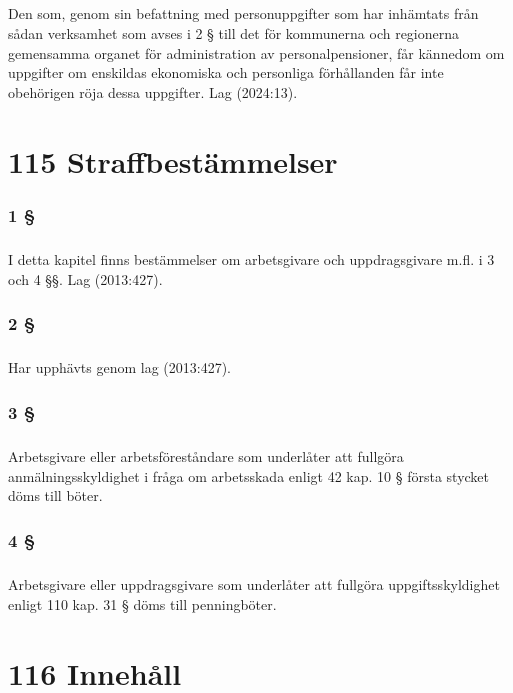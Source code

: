 \documentclass[a4paper,notitlepage,openany,10pt]{book}
\begin{document}
\paragraph*{}
Den som, genom sin befattning med personuppgifter som har inhämtats från sådan verksamhet som avses i 2 § till det för kommunerna och regionerna gemensamma organet för administration av personalpensioner, får kännedom om uppgifter om enskildas ekonomiska och personliga förhållanden får inte obehörigen röja dessa uppgifter.
Lag (2024:13).
\chapter*{115 Straffbestämmelser}
\subsection*{1 §}
\paragraph*{}
I detta kapitel finns bestämmelser om arbetsgivare och uppdragsgivare m.fl. i 3 och 4 §§.
Lag (2013:427).
\subsection*{2 §}
\paragraph*{}
Har upphävts genom
lag (2013:427).
\subsection*{3 §}
\paragraph*{}
Arbetsgivare eller arbetsföreståndare som underlåter att fullgöra anmälningsskyldighet i fråga om arbetsskada enligt 42 kap. 10 § första stycket döms till böter.
\subsection*{4 §}
\paragraph*{}
Arbetsgivare eller uppdragsgivare som underlåter att fullgöra uppgiftsskyldighet enligt 110 kap. 31 § döms till penningböter.
\chapter*{116 Innehåll}
\end{document}
